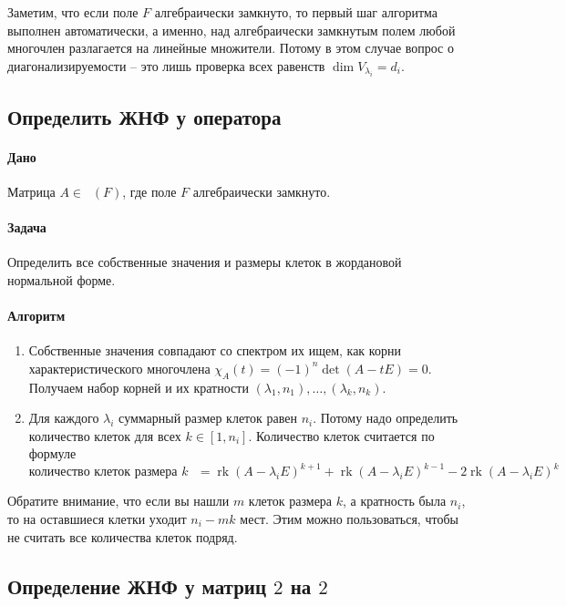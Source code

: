 \documentclass{article}
\newcommand{\Matrix}[2]{\mathop{\mathrm{M}_{#2}}(#1)}
\newcommand{\rk}{\operatorname{rk}}
\begin{document}
Заметим, что если поле $F$ алгебраически замкнуто, то первый шаг алгоритма выполнен автоматически, а именно, над алгебраически замкнутым полем любой многочлен разлагается на линейные множители. Потому в этом случае вопрос о диагонализируемости -- это лишь проверка всех равенств $\dim V_{\lambda_i} = d_i$.


\subsection{Определить ЖНФ у оператора}

\paragraph{Дано} Матрица $A\in \Matrix{F}{n}$, где поле $F$ алгебраически замкнуто.

\paragraph{Задача} Определить все собственные значения и размеры клеток в жордановой нормальной форме.

\paragraph{Алгоритм}
\begin{enumerate}
\item Собственные значения совпадают со спектром их ищем, как корни характеристического многочлена $\chi_A(t) = (-1)^n\det(A - t E) = 0$. Получаем набор корней и их кратности $(\lambda_1, n_1),\ldots,(\lambda_k,n_k)$.

\item Для каждого $\lambda_i$ суммарный размер клеток равен $n_i$. Потому надо определить количество клеток для всех $k\in [1, n_i]$. Количество клеток считается по формуле
\[
\text{количество клеток размера $k$ } = \rk (A - \lambda_i E)^{k+1} + \rk(A - \lambda_i E)^{k-1} - 2 \rk(A - \lambda_i E)^k
\]
\end{enumerate}

Обратите внимание, что если вы нашли $m$ клеток размера $k$, а кратность была $n_i$, то на оставшиеся клетки уходит $n_i - mk$ мест. Этим можно пользоваться, чтобы не считать все количества клеток подряд.


\subsection{Определение ЖНФ у матриц $2$ на $2$}
\end{document}
